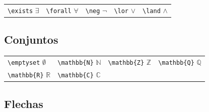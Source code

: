 \documentclass[
  spanish,
  a4paper,
]{scrreport}
\newcounter{none} %
\theoremstyle{definition}
\theoremstyle{remark}
\begin{document}
{\def\LTcaptype{none} %
\begin{longtable}[]{@{}
  >{\raggedright\arraybackslash}p{}
  >{\raggedright\arraybackslash}p{}
  >{\raggedright\arraybackslash}p{}
  >{\raggedright\arraybackslash}p{}
  >{\raggedright\arraybackslash}p{}@{}}
\toprule\noalign{}
\endhead
\bottomrule\noalign{}
\endlastfoot
\texttt{\textbackslash{}exists} \(\exists\) &
\texttt{\textbackslash{}forall} \(\forall\) &
\texttt{\textbackslash{}neg} \(\neg\) & \texttt{\textbackslash{}lor}
\(\lor\) & \texttt{\textbackslash{}land} \(\land\) \\
\end{longtable}
}

\subsection{Conjuntos}\label{conjuntos}

{\def\LTcaptype{none} %
\begin{longtable}[]{@{}
  >{\raggedright\arraybackslash}p{}
  >{\raggedright\arraybackslash}p{}
  >{\raggedright\arraybackslash}p{}
  >{\raggedright\arraybackslash}p{}@{}}
\toprule\noalign{}
\endhead
\bottomrule\noalign{}
\endlastfoot
\texttt{\textbackslash{}emptyset} \(\emptyset\) &
\texttt{\textbackslash{}mathbb\{N\}} \(\mathbb{N}\) &
\texttt{\textbackslash{}mathbb\{Z\}} \(\mathbb{Z}\) &
\texttt{\textbackslash{}mathbb\{Q\}} \(\mathbb{Q}\) \\
\texttt{\textbackslash{}mathbb\{R\}} \(\mathbb{R}\) &
\texttt{\textbackslash{}mathbb\{C\}} \(\mathbb{C}\) & & \\
\end{longtable}
}

\subsection{Flechas}\label{flechas}
\end{document}
